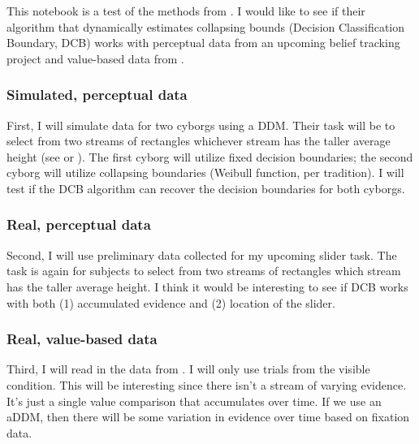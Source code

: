 \documentclass[
]{book}
\begin{document}
This notebook is a test of the methods from \citep{glickman2022}. I would like to see if their algorithm that dynamically estimates collapsing bounds (Decision Classification Boundary, DCB) works with perceptual data from an upcoming belief tracking project and value-based data from \citep{eum2022}.

\hypertarget{simulated-perceptual-data}{%
\subsubsection*{Simulated, perceptual data}\label{simulated-perceptual-data}}

First, I will simulate data for two cyborgs using a DDM. Their task will be to select from two streams of rectangles whichever stream has the taller average height (see \citep{tsetsos2016} or \citep{glickman2022}). The first cyborg will utilize fixed decision boundaries; the second cyborg will utilize collapsing boundaries (Weibull function, per tradition). I will test if the DCB algorithm can recover the decision boundaries for both cyborgs.

\hypertarget{real-perceptual-data}{%
\subsubsection*{Real, perceptual data}\label{real-perceptual-data}}

Second, I will use preliminary data collected for my upcoming slider task. The task is again for subjects to select from two streams of rectangles which stream has the taller average height. I think it would be interesting to see if DCB works with both (1) accumulated evidence and (2) location of the slider.

\hypertarget{real-value-based-data}{%
\subsubsection*{Real, value-based data}\label{real-value-based-data}}

Third, I will read in the data from \citep{eum2022}. I will only use trials from the visible condition. This will be interesting since there isn't a stream of varying evidence. It's just a single value comparison that accumulates over time. If we use an aDDM, then there will be some variation in evidence over time based on fixation data.
\end{document}
